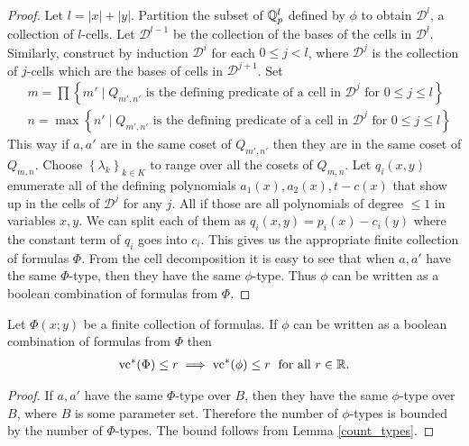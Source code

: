 \documentclass{amsart}
\newcommand{\DD}{\mathscr D}
\newcommand{\curly}[1]{\left\{#1\right\}}
\begin{document}
\begin{proof}
  Let $l = |x| + |y|$.
  Partition the subset of $\mathbb{Q}_p^l$ defined by $\phi$ to obtain $\DD^l$, a collection of $l$-cells.
  Let $\DD^{l-1}$ be the collection of the bases of the cells in $\DD^l$.
  Similarly, construct by induction $\DD^i$ for each $0 \leq j < l$,
  where $\DD^j$ is the collection of $j$-cells which are the bases of cells in $\DD^{j+1}$.
  Set
  \begin{align*}
    &m = \prod \curly{m' \mid Q_{m',n'} \text{ is the defining predicate of a cell in $\DD^j$ for $0 \leq j \leq l$} } \\
    &n = \max \curly{n' \mid Q_{m',n'} \text{ is the defining predicate of a cell in $\DD^j$ for $0 \leq j \leq l$} }
  \end{align*}
  This way if $a, a'$ are in the same coset of $Q_{m',n'}$ then they are in the same coset of $Q_{m,n}$.
  Choose $\curly{\lambda_k}_{k \in K}$ to range over all the cosets of $Q_{m,n}$.
  Let $q_i(x, y)$ enumerate all of the defining polynomials $a_1(x), a_2(x), t - c(x)$ that show up in the cells of $\DD^j$ for any $j$.
  All if those are all polynomials of degree $\leq 1$ in variables $x, y$.
  We can split each of them as $q_i(x,y) = p_i(x) - c_i(y)$ where the constant term of $q_i$ goes into $c_i$.
  This gives us the appropriate finite collection of formulas $\Phi$.
  From the cell decomposition it is easy to see that when $a, a'$ have the same $\Phi$-type,
  then they have the same $\phi$-type.
  Thus $\phi$ can be written as a boolean combination of formulas from $\Phi$.
\end{proof}

\begin{Lemma}
  Let $\Phi(x; y)$ be a finite collection of formulas.
  If $\phi$ can be written as a boolean combination of formulas from $\Phi$ then
  \begin{align*}
    \operatorname{vc}^* (\Phi) \leq r \implies \operatorname{vc}^* (\phi) \leq r \; \text{ for all } r \in \mathbb{R}.
  \end{align*}
\end{Lemma}
\begin{proof}
  If $a,a'$ have the same $\Phi$-type over $B$, then they have the same $\phi$-type over $B$, where $B$ is some parameter set.
  Therefore the number of $\phi$-types is bounded by the number of $\Phi$-types.
  The bound follows from Lemma \ref{count_types}.
\end{proof}
\end{document}
